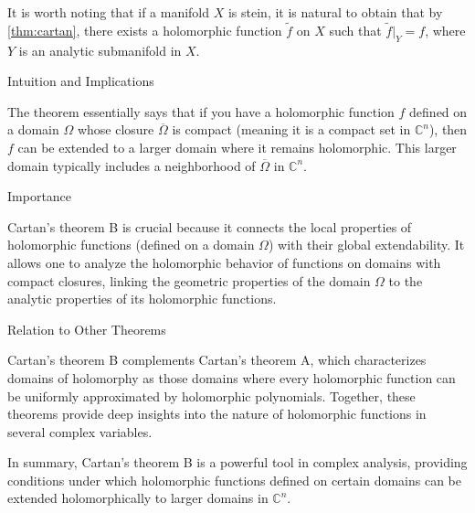 \documentclass[lang=en,12pt]{beautybook}
\begin{document}
\begin{remark}
  It is worth noting that if a manifold $X$ is stein, it is natural to obtain that by \autoref{thm:cartan},  there exists a holomorphic function $\widetilde{f}$ on $X$ such that $\widetilde{f}|_Y=f$, where $Y$ is  an analytic submanifold in $X$.  
\end{remark}
Intuition and Implications

The theorem essentially says that if you have a holomorphic function \( f \) defined on a domain \( \Omega \) whose closure \( \overline{\Omega} \) is compact (meaning it is a compact set in \( \mathbb{C}^n \)), then \( f \) can be extended to a larger domain where it remains holomorphic. This larger domain typically includes a neighborhood of \( \overline{\Omega} \) in \( \mathbb{C}^n \).

Importance

Cartan's theorem B is crucial because it connects the local properties of holomorphic functions (defined on a domain \( \Omega \)) with their global extendability. It allows one to analyze the holomorphic behavior of functions on domains with compact closures, linking the geometric properties of the domain \( \Omega \) to the analytic properties of its holomorphic functions.

Relation to Other Theorems

Cartan's theorem B complements Cartan's theorem A, which characterizes domains of holomorphy as those domains where every holomorphic function can be uniformly approximated by holomorphic polynomials. Together, these theorems provide deep insights into the nature of holomorphic functions in several complex variables.

In summary, Cartan's theorem B is a powerful tool in complex analysis, providing conditions under which holomorphic functions defined on certain domains can be extended holomorphically to larger domains in \( \mathbb{C}^n \).



















\printbibliography[heading=bibintoc,title={Bibliography}]\printindex\thispagestyle{empty}
\ISBNcode{\EANisbn[ISBN=978-80-7340-097-2]} %
\makebottomcover
\end{document}
